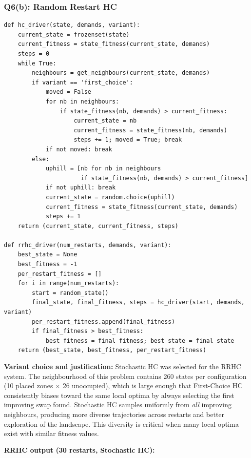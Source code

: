 \documentclass[12pt,a4paper]{article}
\begin{document}
\subsubsection*{Q6(b): Random Restart HC}

\begin{lstlisting}[style=pycode, caption={Q6(b): RRHC for driver positioning}]
def hc_driver(state, demands, variant):
    current_state = frozenset(state)
    current_fitness = state_fitness(current_state, demands)
    steps = 0
    while True:
        neighbours = get_neighbours(current_state, demands)
        if variant == 'first_choice':
            moved = False
            for nb in neighbours:
                if state_fitness(nb, demands) > current_fitness:
                    current_state = nb
                    current_fitness = state_fitness(nb, demands)
                    steps += 1; moved = True; break
            if not moved: break
        else:
            uphill = [nb for nb in neighbours
                      if state_fitness(nb, demands) > current_fitness]
            if not uphill: break
            current_state = random.choice(uphill)
            current_fitness = state_fitness(current_state, demands)
            steps += 1
    return (current_state, current_fitness, steps)

def rrhc_driver(num_restarts, demands, variant):
    best_state = None
    best_fitness = -1
    per_restart_fitness = []
    for i in range(num_restarts):
        start = random_state()
        final_state, final_fitness, steps = hc_driver(start, demands, variant)
        per_restart_fitness.append(final_fitness)
        if final_fitness > best_fitness:
            best_fitness = final_fitness; best_state = final_state
    return (best_state, best_fitness, per_restart_fitness)
\end{lstlisting}

\textbf{Variant choice and justification:}
Stochastic HC was selected for the RRHC system.
The neighbourhood of this problem contains 260 states per configuration
(10 placed zones $\times$ 26 unoccupied), which is large enough that
First-Choice HC consistently biases toward the same local optima by always
selecting the first improving swap found.
Stochastic HC samples uniformly from \emph{all} improving neighbours, producing
more diverse trajectories across restarts and better exploration of the landscape.
This diversity is critical when many local optima exist with similar fitness values.

\textbf{RRHC output (30 restarts, Stochastic HC):}
\end{document}
